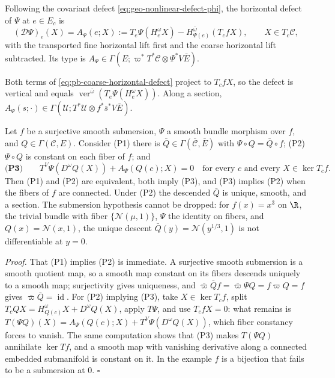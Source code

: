 Following the covariant defect \eqref{eq:geo-nonlinear-defect-phi}, the horizontal defect of \(\Psi\)
at \(e\in E_c\) is
\begin{equation}
(\mathcal D\Psi)_e(X)
=A_\Psi(e;X)
:=T_e\Psi(H_e^\omega X)
-H_{\Psi(e)}^{\bar\omega}(T_cfX),
\qquad X\in T_c\mathcal C,
\label{eq:pb-coarse-horizontal-defect}
\end{equation}
with the transported fine horizontal lift first and the coarse horizontal lift subtracted. Its type is
\(A_\Psi\in\Gamma(E;\varpi^*T^*\mathcal C\otimes\Psi^*V\bar E)\).

Both terms of \eqref{eq:pb-coarse-horizontal-defect} project to \(T_cfX\), so the defect is vertical
and equals \(\operatorname{ver}^{\bar\omega}(T_e\Psi(H_e^\omega X))\). Along a section,
\(A_\Psi(s;\cdot)\in\Gamma(\mathcal U;T^*\mathcal U\otimes f^*\bar s^*V\bar E)\).

Let \(f\) be a surjective smooth submersion, \(\Psi\) a smooth bundle morphism over \(f\), and
\(Q\in\Gamma(\mathcal C,E)\). Consider (P1) there is \(\bar Q\in\Gamma(\bar{\mathcal C},\bar E)\) with
\(\Psi\circ Q=\bar Q\circ f\); (P2) \(\Psi\circ Q\) is constant on each fiber of \(f\); and
\begin{equation}
\textbf{(P3)}\qquad
T^V\Psi\left(D^\omega Q(X)\right)+A_\Psi\left(Q(c);X\right)=0
\quad\text{for every }c\text{ and every }X\in\ker T_cf.
\label{eq:pb-projectability-criterion}
\end{equation}
Then (P1) and (P2) are equivalent, both imply (P3), and (P3) implies (P2) when the fibers of \(f\)
are connected. Under (P2) the descended \(\bar Q\) is unique, smooth, and a section. The submersion
hypothesis cannot be dropped: for \(f(x)=x^3\) on \(\R\), the trivial bundle with fiber
\(\{\mathcal N(\mu,1)\}\), \(\Psi\) the identity on fibers, and \(Q(x)=\mathcal N(x,1)\), the unique
descent \(\bar Q(y)=\mathcal N(y^{1/3},1)\) is not differentiable at \(y=0\). 

\noindent\emph{Proof.}
That (P1) implies (P2) is immediate. A surjective smooth submersion is a smooth quotient map, so a
smooth map constant on its fibers descends uniquely to a smooth map; surjectivity gives uniqueness,
and \(\bar\varpi\bar Qf=\bar\varpi\Psi Q=f\varpi Q=f\) gives \(\bar\varpi\bar Q=\operatorname{id}\).
For (P2) implying (P3), take \(X\in\ker T_cf\), split \(T_cQX=H^\omega_{Q(c)}X+D^\omega Q(X)\), apply
\(T\Psi\), and use \(T_cfX=0\): what remains is
\(T(\Psi Q)(X)=A_\Psi(Q(c);X)+T^V\Psi(D^\omega Q(X))\), which fiber constancy forces to vanish. The
same computation shows that (P3) makes \(T(\Psi Q)\) annihilate \(\ker Tf\), and a smooth map with
vanishing derivative along a connected embedded submanifold is constant on it. In the example
\(f\) is a bijection that fails to be a submersion at \(0\). \hfill$\square$

